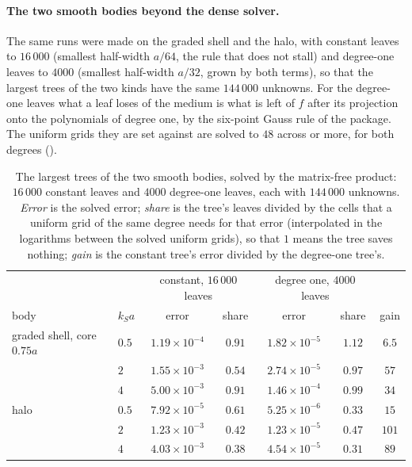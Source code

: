 \documentclass[11pt,a4paper]{article}
\begin{document}
\paragraph{The two smooth bodies beyond the dense solver.} The same runs were made on the graded shell
and the halo, with constant leaves to $16\,000$ (smallest half-width $a/64$, the rule that does not
stall) and degree-one leaves to $4000$ (smallest half-width $a/32$, grown by both terms), so that the
largest trees of the two kinds have the same $144\,000$ unknowns. For the degree-one leaves what a leaf
loses of the medium is what is left of $f$ after its projection onto the polynomials of degree one, by
the six-point Gauss rule of the package. The uniform grids they are set against are solved to $48$
across or more, for both degrees
().
\begin{table}[htbp]
\centering
\caption{The largest trees of the two smooth bodies, solved by the matrix-free product: $16\,000$
constant leaves and $4000$ degree-one leaves, each with $144\,000$ unknowns. \emph{Error} is the solved
error; \emph{share} is the tree's leaves divided by the cells that a uniform grid of the same degree
needs for that error (interpolated in the logarithms between the solved uniform grids), so that $1$
means the tree saves nothing; \emph{gain} is the constant tree's error divided by the degree-one
tree's.}\label{tab:treessmooth}
\small
\begin{tabular}{@{}llccccc@{}}
\toprule
 & & \multicolumn{2}{c}{constant, $16\,000$ leaves} & \multicolumn{2}{c}{degree one, $4000$ leaves} & \\
body & $k_Sa$ & error & share & error & share & gain \\
\midrule
graded shell, core $0.75a$ & $0.5$ & $1.19\times10^{-4}$ & $0.91$ & $1.82\times10^{-5}$ & $1.12$ & $6.5$ \\
                           & $2$   & $1.55\times10^{-3}$ & $0.54$ & $2.74\times10^{-5}$ & $0.97$ & $57$ \\
                           & $4$   & $5.00\times10^{-3}$ & $0.91$ & $1.46\times10^{-4}$ & $0.99$ & $34$ \\
\midrule
halo                       & $0.5$ & $7.92\times10^{-5}$ & $0.61$ & $5.25\times10^{-6}$ & $0.33$ & $15$ \\
                           & $2$   & $1.23\times10^{-3}$ & $0.42$ & $1.23\times10^{-5}$ & $0.47$ & $101$ \\
                           & $4$   & $4.03\times10^{-3}$ & $0.38$ & $4.54\times10^{-5}$ & $0.31$ & $89$ \\
\bottomrule
\end{tabular}
\end{table}
\end{document}
